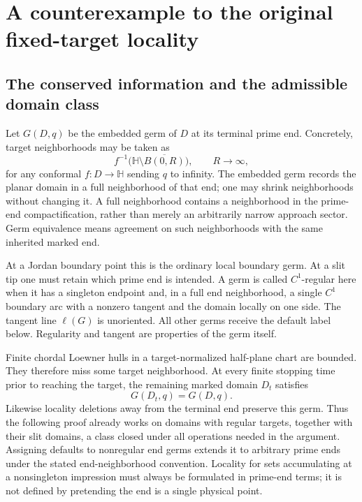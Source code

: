 \documentclass[11pt]{article}
\theoremstyle{definition}\newtheorem{definition}[theorem]{Definition}
\theoremstyle{remark}\newtheorem{remark}[theorem]{Remark}
\newcommand{\HH}{\mathbb H}
\begin{document}
\section{A counterexample to the original fixed-target locality}
\label{sec:target-germ}

\subsection{The conserved information and the admissible domain class}

Let $G(D,q)$ be the embedded germ of $D$ at its terminal prime end.
Concretely, target neighborhoods may be taken as
\[
 f^{-1}\bigl(\HH\setminus\overline{B(0,R)}\bigr),\qquad R\to\infty,
\]
for any conformal $f:D\to\HH$ sending $q$ to infinity. The embedded
germ records the planar domain in a full neighborhood of that end;
one may shrink neighborhoods without changing it. A full neighborhood
contains a neighborhood in the prime-end compactification, rather than
merely an arbitrarily narrow approach sector. Germ equivalence means
agreement on such neighborhoods with the same inherited marked end.

At a Jordan boundary point this is the ordinary local boundary germ.
At a slit tip one must retain which prime end is intended. A germ is
called $C^1$-regular here when it has a singleton endpoint and, in a full
end neighborhood, a single $C^1$ boundary arc with a nonzero tangent and
the domain locally on one side. The tangent line $\ell(G)$ is unoriented.
All other germs receive the default label below. Regularity and tangent
are properties of the germ itself.

Finite chordal Loewner hulls in a target-normalized half-plane chart are
bounded. They therefore miss some target neighborhood. At every finite
stopping time prior to reaching the target, the remaining marked domain
$D_t$ satisfies
\begin{equation}
 G(D_t,q)=G(D,q).
 \label{eq:germ-persistent}
\end{equation}
Likewise locality deletions away from the terminal end preserve this germ.
Thus the following proof already works on domains with regular targets,
together with their slit domains, a class closed under all operations
needed in the argument. Assigning defaults to nonregular end germs extends
it to arbitrary prime ends under the stated end-neighborhood convention.
Locality for sets accumulating at a nonsingleton impression must always be
formulated in prime-end terms; it is not defined by pretending the end is
a single physical point.
\end{document}

